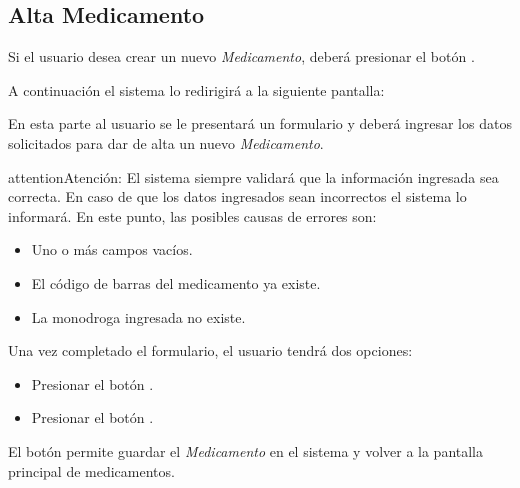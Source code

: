 \documentclass[a4paper,10pt,spanish]{sphinxmanual}
\begin{document}
\subsection{Alta Medicamento}
\label{medicams:id1}\label{medicams:alta-medicamento}
Si el usuario desea crear un nuevo \emph{Medicamento}, deberá presionar el botón .


A continuación el sistema lo redirigirá a la siguiente pantalla:


En esta parte al usuario se le presentará un formulario y deberá ingresar los datos solicitados para dar de alta un nuevo \emph{Medicamento}.

\begin{notice}{attention}{Atención:}
El sistema siempre validará que la información ingresada sea correcta. En caso de que los datos ingresados sean incorrectos el sistema lo informará.
En este punto, las posibles causas de errores son:
\begin{itemize}
\item {} 
Uno o más campos vacíos.

\item {} 
El código de barras del medicamento ya existe.

\item {} 
La monodroga ingresada no existe.

\end{itemize}
\end{notice}

Una vez completado el formulario, el usuario tendrá dos opciones:
\begin{itemize}
\item {} 
Presionar el botón .

\item {} 
Presionar el botón .

\end{itemize}

El botón  permite guardar el \emph{Medicamento} en el sistema y volver a la pantalla
principal de medicamentos.
\end{document}
